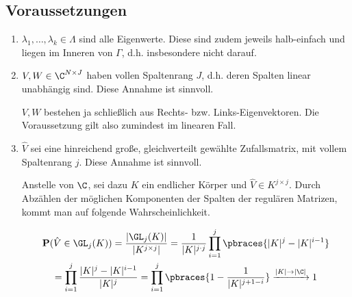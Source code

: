 \subsection*{Voraussetzungen}

\begin{enumerate}[label = \arabic*.]

    \item $\lambda_1, \dots, \lambda_k \in \Lambda$ sind alle Eigenwerte.
    Diese sind zudem jeweils halb-einfach und liegen im Inneren von $\Gamma$, d.h. insbesondere nicht darauf.

    \item $V, W \in \C^{N \times J}$ haben vollen Spaltenrang $J$, d.h. deren Spalten linear unabhängig sind.
    Diese Annahme ist sinnvoll.

    $V, W$ bestehen ja schließlich aus Rechts- bzw. Links-Eigenvektoren.
    Die Voraussetzung gilt also zumindest im linearen Fall.
    
    \item $\hat V$ sei eine hinreichend große, gleichverteilt gewählte Zufallsmatrix, mit vollem Spaltenrang $j$.
    Diese Annahme ist sinnvoll.

    Anstelle von $\C$, sei dazu $K$ ein endlicher Körper und $\hat V \in K^{j \times j}$.
    Durch Abzählen der möglichen Komponenten der Spalten der regulären Matrizen, kommt man auf folgende Wahrscheinlichkeit.

    \begin{multline*}
        \mathbf{P}(\hat V \in \GL_j(K))
        =
        \frac
        {
            |\GL_j(K)|
        }{
            |K^{j \times j}|
        }
        =
        \frac{1}
        {
            |K|^{j \cdot j}
        }
        \prod_{i=1}^j
            \pbraces
            {
                |K|^j - |K|^{i-1}
            } \\
        =
        \prod_{i=1}^j
            \frac
            {
                |K|^j - |K|^{i-1}
            }{
                |K|^j
            }
        =
        \prod_{i=1}^j
            \pbraces
            {
                1 - \frac{1}{|K|^{j + 1 - i}}
            }
        \xrightarrow{|K| \to |\C|}
        1
    \end{multline*}

\end{enumerate}
